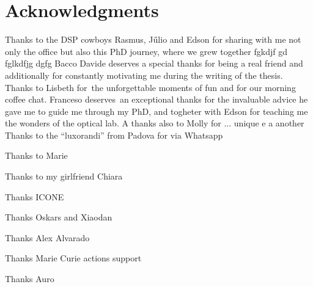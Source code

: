 \chapter{Acknowledgments}

Thanks to the DSP cowboys Rasmus, Jűlio and Edson for sharing with me not only the office but also this PhD journey, where we grew together fgkdjf gd fglkdfjg dgfg
Bacco Davide deserves a special thanks for being a real friend and additionally for constantly motivating me
 during the writing of the thesis. Thanks to Lisbeth \mbox{for the} unforgettable moments of fun and for our morning coffee chat. Franceso \mbox{deserves an} exceptional thanks for the invaluable advice he gave me to guide me through my PhD, and togheter with Edson for teaching me the wonders of the optical lab. A thanks also to Molly for ...
unique
e
a
another
Thanks to the ``luxorandi'' from Padova for via Whatsapp

Thanks to Marie

Thanks to my girlfriend Chiara


Thanks ICONE

Thanks Oskars and Xiaodan

Thanks Alex Alvarado

Thanks Marie Curie actions support

Thanks Auro
